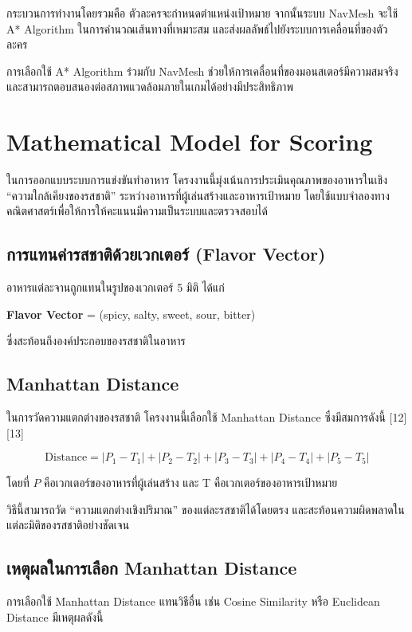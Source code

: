 กระบวนการทำงานโดยรวมคือ ตัวละครจะกำหนดตำแหน่งเป้าหมาย จากนั้นระบบ NavMesh จะใช้ A* Algorithm ในการคำนวณเส้นทางที่เหมาะสม และส่งผลลัพธ์ไปยังระบบการเคลื่อนที่ของตัวละคร

การเลือกใช้ A* Algorithm ร่วมกับ NavMesh ช่วยให้การเคลื่อนที่ของมอนสเตอร์มีความสมจริง และสามารถตอบสนองต่อสภาพแวดล้อมภายในเกมได้อย่างมีประสิทธิภาพ

\section{Mathematical Model for Scoring}
\hspace{1.5em}ในการออกแบบระบบการแข่งขันทำอาหาร โครงงานนี้มุ่งเน้นการประเมินคุณภาพของอาหารในเชิง \\“ความใกล้เคียงของรสชาติ” ระหว่างอาหารที่ผู้เล่นสร้างและอาหารเป้าหมาย โดยใช้แบบจำลองทาง\\คณิตศาสตร์เพื่อให้การให้คะแนนมีความเป็นระบบและตรวจสอบได้

\subsection{การแทนค่ารสชาติด้วยเวกเตอร์ (Flavor Vector)}
\hspace{1.5em}อาหารแต่ละจานถูกแทนในรูปของเวกเตอร์ 5 มิติ ได้แก่

\begin{center}
\textbf{Flavor Vector} = (spicy, salty, sweet, sour, bitter)
\end{center}

ซึ่งสะท้อนถึงองค์ประกอบของรสชาติในอาหาร

\subsection{Manhattan Distance}
\hspace{1.5em}ในการวัดความแตกต่างของรสชาติ โครงงานนี้เลือกใช้ Manhattan Distance ซึ่งมีสมการดังนี้ [12][13]

\[
\text{Distance} = \left|P_1 - T_1\right| + \left|P_2 - T_2\right| + \left|P_3 - T_3\right| + \left|P_4 - T_4\right| + \left|P_5 - T_5\right|
\]

โดยที่ $P$ คือเวกเตอร์ของอาหารที่ผู้เล่นสร้าง และ T คือเวกเตอร์ของอาหารเป้าหมาย

\vspace{1\baselineskip}
วิธีนี้สามารถวัด “ความแตกต่างเชิงปริมาณ” ของแต่ละรสชาติได้โดยตรง และสะท้อนความผิดพลาดในแต่ละมิติของรสชาติอย่างชัดเจน
\newpage
\subsection{เหตุผลในการเลือก Manhattan Distance}
\hspace{1.5em}การเลือกใช้ Manhattan Distance แทนวิธีอื่น เช่น Cosine Similarity หรือ Euclidean Distance มีเหตุผลดังนี้

